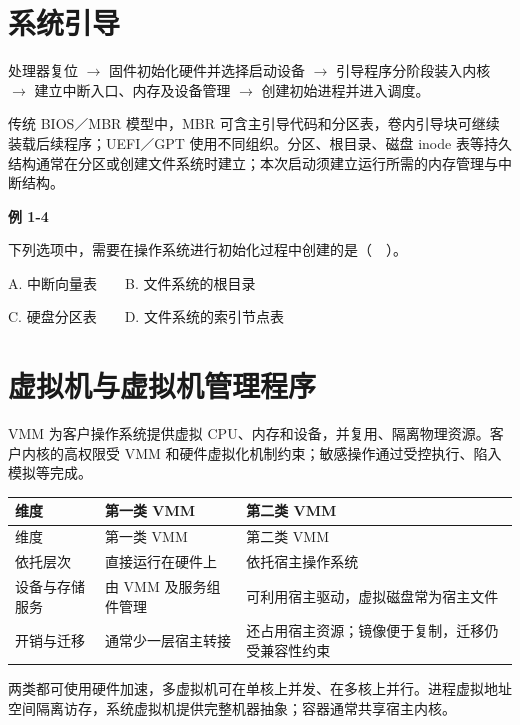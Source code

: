 \section{系统引导}\label{OS01-boot}

处理器复位 \ensuremath{\to} 固件初始化硬件并选择启动设备 \ensuremath{\to} 引导程序分阶段装入内核 \ensuremath{\to} 建立中断入口、内存及设备管理 \ensuremath{\to} 创建初始进程并进入调度。

传统 BIOS／MBR 模型中，MBR 可含主引导代码和分区表，卷内引导块可继续装载后续程序；UEFI／GPT 使用不同组织。分区、根目录、磁盘 inode 表等持久结构通常在分区或创建文件系统时建立；本次启动须建立运行所需的内存管理与中断结构。

\par\medskip{}\noindent\hypertarget{OS01-E04}{}\label{OS01-E04}\textbf{例 1-4}\par\nobreak\smallskip

下列选项中，需要在操作系统进行初始化过程中创建的是（　）。

A. 中断向量表　　B. 文件系统的根目录

C. 硬盘分区表　　D. 文件系统的索引节点表

\section{虚拟机与虚拟机管理程序}\label{OS01-vmm}

VMM 为客户操作系统提供虚拟 CPU、内存和设备，并复用、隔离物理资源。客户内核的高权限受 VMM 和硬件虚拟化机制约束；敏感操作通过受控执行、陷入模拟等完成。

\par\smallskip
\begin{wideblock}
{\fontsize{9.3}{12}\selectfont\setlength{\tabcolsep}{2.5pt}\setlength{\LTleft}{0pt}\setlength{\LTright}{0pt}
\begin{longtable}{@{}>{\raggedright\arraybackslash}p{}>{\raggedright\arraybackslash}p{}>{\raggedright\arraybackslash}p{}@{}}
\toprule
维度 & 第一类 VMM & 第二类 VMM \\

\midrule\endfirsthead\toprule
维度 & 第一类 VMM & 第二类 VMM \\

\midrule\endhead\bottomrule\endfoot
依托层次 & 直接运行在硬件上 & 依托宿主操作系统 \\

设备与存储服务 & 由 VMM 及服务组件管理 & 可利用宿主驱动，虚拟磁盘常为宿主文件 \\

开销与迁移 & 通常少一层宿主转接 & 还占用宿主资源；镜像便于复制，迁移仍受兼容性约束 \\

\end{longtable}}
\end{wideblock}
\par\smallskip

两类都可使用硬件加速，多虚拟机可在单核上并发、在多核上并行。进程虚拟地址空间隔离访存，系统虚拟机提供完整机器抽象；容器通常共享宿主内核。
